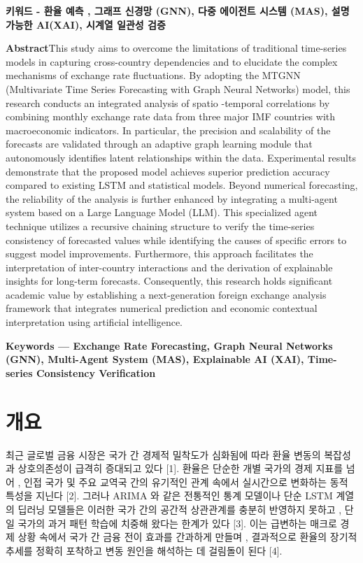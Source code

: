 \documentclass[10pt,a4paper]{article}
\begin{document}
\par
\noindent\textbf{키워드 - 환율 예측 , 그래프 신경망 (GNN), 다중 에이전트 시스템 (MAS), 설명 가능한 AI(XAI), 시계열 일관성 검증}
\par
\vspace{1mm}
\noindent\textbf{Abstract}\quad This study aims to overcome the limitations of traditional time-series models in capturing cross-country dependencies and to elucidate the complex mechanisms of exchange rate fluctuations. By adopting the MTGNN (Multivariate Time Series Forecasting with Graph Neural Networks) model, this research conducts an integrated analysis of spatio -temporal correlations by combining monthly exchange rate data from three major IMF countries with macroeconomic indicators. In particular, the precision and scalability of the forecasts are validated through an adaptive graph learning module that autonomously identifies latent relationships within the data. Experimental results demonstrate that the proposed model achieves superior prediction accuracy compared to existing LSTM and statistical models. Beyond numerical forecasting, the reliability of the analysis is further enhanced by integrating a multi-agent system based on a Large Language Model (LLM). This specialized agent technique utilizes a recursive chaining structure to verify the time-series consistency of forecasted values while identifying the causes of specific errors to suggest model improvements. Furthermore, this approach facilitates the interpretation of inter-country interactions and the derivation of explainable insights for long-term forecasts. Consequently, this research holds significant academic value by establishing a next-generation foreign exchange analysis framework that integrates numerical prediction and economic contextual interpretation using artificial intelligence.
\par
\noindent\textbf{Keywords — Exchange Rate Forecasting, Graph Neural Networks (GNN), Multi-Agent System (MAS), Explainable AI (XAI), Time-series Consistency Verification}
\par
\vspace{2mm}
\twocolumn
\section{개요}
최근 글로벌 금융 시장은 국가 간 경제적 밀착도가 심화됨에 따라 환율 변동의 복잡성과 상호의존성이 급격히 증대되고 있다 [1]. 환율은 단순한 개별 국가의 경제 지표를 넘어 , 인접 국가 및 주요 교역국 간의 유기적인 관계 속에서 실시간으로 변화하는 동적 특성을 지닌다 [2]. 그러나 ARIMA 와 같은 전통적인 통계 모델이나 단순 LSTM 계열의 딥러닝 모델들은 이러한 국가 간의 공간적 상관관계를 충분히 반영하지 못하고 , 단일 국가의 과거 패턴 학습에 치중해 왔다는 한계가 있다 [3]. 이는 급변하는 매크로 경제 상황 속에서 국가 간 금융 전이 효과를 간과하게 만들며 , 결과적으로 환율의 장기적 추세를 정확히 포착하고 변동 원인을 해석하는 데 걸림돌이 된다 [4].
\end{document}
